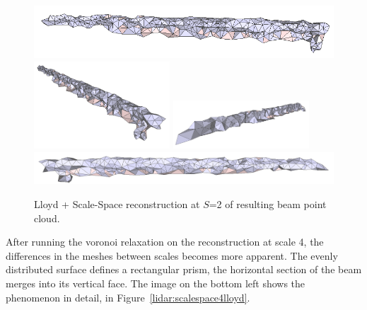 \documentclass[12pt]{drexelthesis}
\begin{document}
\begin{figure}[!ht]
	\centering
		\includegraphics[width=5in]{real-lab-scans/optimizedNeat/scalespace2lloyd00.png}
		\includegraphics[width=2in]{real-lab-scans/optimizedNeat/scalespace2lloyd01.png}
		\includegraphics[width=2in]{real-lab-scans/optimizedNeat/scalespace2lloyd02.png}
		\includegraphics[width=5in]{real-lab-scans/optimizedNeat/scalespace2lloyd03.png}
		\caption[Lloyd + Scale-Space reconstruction at $S$=2 of segmented LiDAR data]{\centering Lloyd + Scale-Space reconstruction at $S$=2 of resulting beam point cloud.}
	\label{lidar:scalespace2lloyd}
\end{figure}

After running the voronoi relaxation on the reconstruction at scale 4, the differences in the meshes between scales becomes more apparent. The evenly distributed surface defines a rectangular prism, the horizontal section of the beam merges into its vertical face. The image on the bottom left shows the phenomenon in detail, in Figure~\ref{lidar:scalespace4lloyd}.
\end{document}
